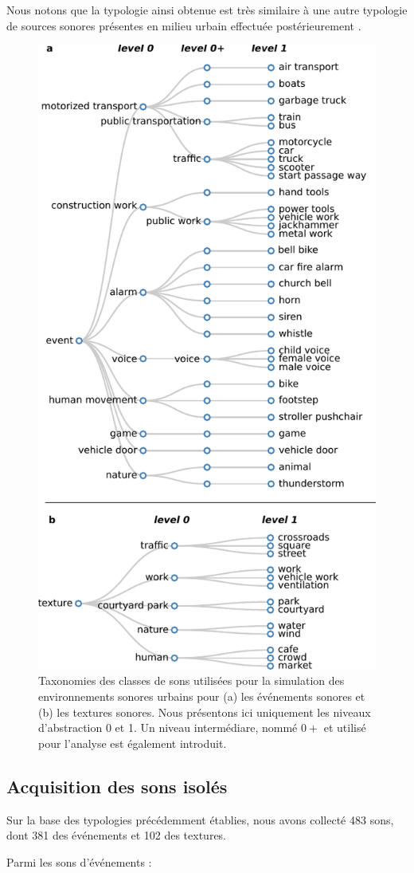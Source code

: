 Nous notons que la typologie ainsi obtenue est très similaire à une autre typologie de sources sonores présentes en milieu urbain effectuée postérieurement \citep{Salamon14}. \\


\begin{figure}[bth]
        \myfloatalign
        \includegraphics[width=.5\linewidth]{gfxHierarchy/taxonomy}
       \caption[Taxonomies des classes de sons utilisées pour la simulation des environnements sonores urbains]{Taxonomies des classes de sons utilisées pour la simulation des environnements sonores urbains pour (a) les événements sonores et (b) les textures sonores. Nous présentons ici uniquement les niveaux d'abstraction 0 et 1. Un niveau intermédiare, nommé $0+$ et utilisé pour l'analyse est également introduit.}\label{fig:taxonomie}
\end{figure}

\subsection{Acquisition des sons isolés}

Sur la base des typologies précédemment établies, nous avons collecté 483 sons, dont 381 des événements et 102 des textures.

Parmi les sons d'événements :


